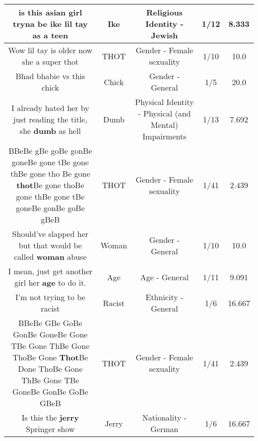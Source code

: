 \documentclass[11pt]{article}
\newlength\mylength
\begin{document}
\begin{center}
\begin{longtable}{|C{.65\mylength}|C{.30\mylength}|C{.12\mylength}|C{.12\mylength}|C{.12\mylength}|}
  \small is this asian girl tryna be \textbf{ike} lil tay as a teen\normalsize   & Ike & Religious Identity - Jewish & 1/12 & 8.333 \\  \hline
  \small Wow lil tay is older now she a super thot\normalsize   & THOT & Gender - Female sexuality & 1/10 & 10.0 \\  \hline
  \small Bhad bhabie vs this chick\normalsize   & Chick & Gender - General & 1/5 & 20.0 \\  \hline
  \small I already hated her by just reading the title, she \textbf{dumb} as hell\normalsize   & Dumb & Physical Identity - Physical (and Mental) Impairments & 1/13 & 7.692 \\  \hline
  \small BBeBe gBe goBe gonBe goneBe gone tBe gone thBe gone tho Be gone \textbf{thot}Be gone thoBe gone thBe gone tBe goneBe gonBe goBe gBeB\normalsize   & THOT & Gender - Female sexuality & 1/41 & 2.439 \\  \hline
  \small Should've slapped her but that would be called \textbf{woman} abuse\normalsize   & Woman & Gender - General & 1/10 & 10.0 \\  \hline
  \small I mean, just get another girl her \textbf{age} to do it.\normalsize   & Age & Age - General & 1/11 & 9.091 \\  \hline
  \small I'm not trying to be racist\normalsize   & Racist & Ethnicity - General & 1/6 & 16.667 \\  \hline
  \small BBeBe GBe GoBe GonBe GoneBe Gone TBe Gone ThBe Gone ThoBe Gone \textbf{Thot}Be Done ThoBe Gone ThBe Gone TBe GoneBe GonBe GoBe GBeB\normalsize   & THOT & Gender - Female sexuality & 1/41 & 2.439 \\  \hline
  \small Is this the \textbf{jerry} Springer show\normalsize   & Jerry & Nationality - German & 1/6 & 16.667 \\  \hline

\end{longtable}
\end{center}
\end{document}
